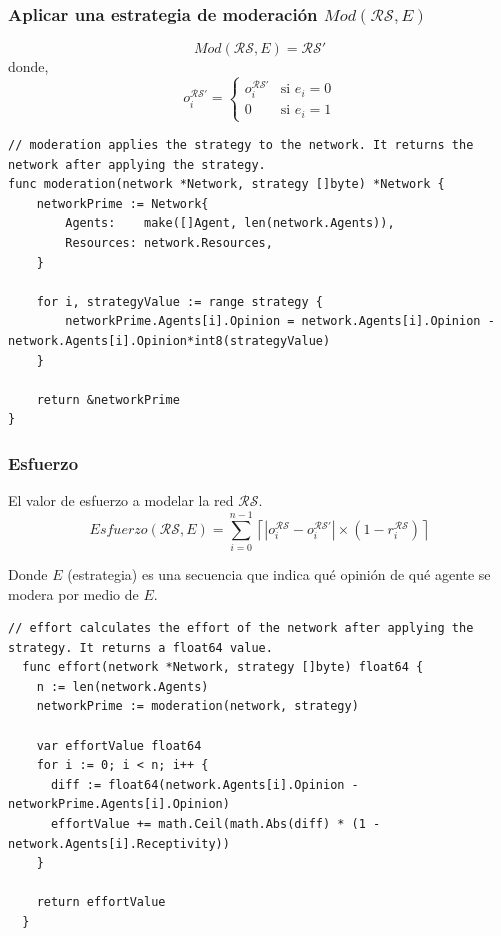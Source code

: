\documentclass[letterpaper,10pt]{article}
\begin{document}
\subsubsection*{Aplicar una estrategia de moderación $Mod(\mathcal{R}\mathcal{S},E)$}
\begin{equation}
  Mod(\mathcal{R}\mathcal{S}, E) = \mathcal{R}\mathcal{S}'
\end{equation}\label{eq:mod}
donde,
\begin{equation}
  o_i^{\mathcal{R}\mathcal{S}'} = 
  \begin{cases} 
        o_i^{\mathcal{R}\mathcal{S}'} & \text{si } e_i = 0 \\
        0        & \text{si } e_i = 1 
  \end{cases}
  \label{eq:mod_opinion}
\end{equation}

\begin{lstlisting}[caption={Implementación del Mod}, label={lst:mod}]
// moderation applies the strategy to the network. It returns the network after applying the strategy.
func moderation(network *Network, strategy []byte) *Network {
	networkPrime := Network{
		Agents:    make([]Agent, len(network.Agents)),
		Resources: network.Resources,
	}

	for i, strategyValue := range strategy {
		networkPrime.Agents[i].Opinion = network.Agents[i].Opinion - network.Agents[i].Opinion*int8(strategyValue)
	}

	return &networkPrime
}
\end{lstlisting}
\newpage
\subsubsection*{Esfuerzo}
El valor de esfuerzo a modelar la red $\mathcal{R}\mathcal{S}$.
\begin{equation}
  Esfuerzo(\mathcal{R}\mathcal{S}, E) = \sum_{i=0}^{n-1} \left\lceil  |o_i^{\mathcal{R}\mathcal{S}} - o_i^{\mathcal{R}\mathcal{S}'}| \times (1 - r_i^{\mathcal{R}\mathcal{S}}) \right\rceil
  \label{eq:esfuerzo}
\end{equation}

Donde $E$ (estrategia) es una secuencia que indica qué opinión de qué agente se modera por medio de $E$.
\begin{lstlisting}[caption={Implementación del esfuerzo}, label={lst:esfuerzo}]
  // effort calculates the effort of the network after applying the strategy. It returns a float64 value.
  func effort(network *Network, strategy []byte) float64 {
    n := len(network.Agents)
    networkPrime := moderation(network, strategy)
  
    var effortValue float64
    for i := 0; i < n; i++ {
      diff := float64(network.Agents[i].Opinion - networkPrime.Agents[i].Opinion)
      effortValue += math.Ceil(math.Abs(diff) * (1 - network.Agents[i].Receptivity))
    }
  
    return effortValue
  }
\end{lstlisting}
\end{document}
